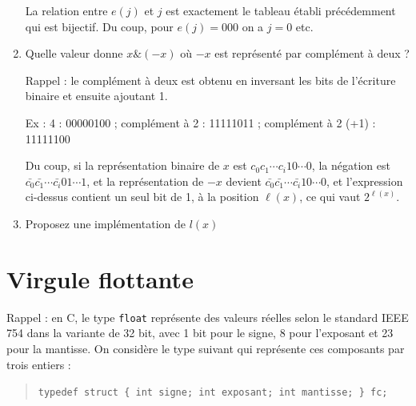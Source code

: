 \documentclass[11pt]{article}
\begin{document}
\begin{enumerate}
\begin{solution}
La relation entre $e(j)$ et $j$ est exactement le tableau établi
précédemment qui est bijectif. Du coup, pour $e(j)=000$
on a $j=0$ etc.
\end{solution}

 \item Quelle valeur donne $x\mathbin{\&}(-x)$
où $-x$ est représenté par complément à deux ?

\begin{solution}
Rappel : le complément à deux est obtenu en inversant les bits de l'écriture
binaire et ensuite ajoutant 1.

Ex : 4 : 00000100 ; complément à 2 : 11111011 ; complément à 2 (+1) : 11111100

Du coup, si la représentation binaire de $x$ est $c_0c_1\cdots c_i10\cdots 0$,
la négation est $\bar{c_0}\bar{c_1}\cdots\bar{c_i}01\cdots 1$, et
la représentation de $-x$ devient $\bar{c_0}\bar{c_1}\cdots\bar{c_i}10\cdots 0$,
et l'expression ci-dessus contient un seul bit de 1, à la position $\ell(x)$,
ce qui vaut $2^{\ell(x)}$.
\end{solution}

 \item Proposez une implémentation de $l(x)$

\end{enumerate}



\section{Virgule flottante}

Rappel : en C, le type \texttt{float} repr\'esente des valeurs r\'eelles
selon le standard IEEE 754 dans la variante de 32 bit, avec 1 bit pour
le signe, 8 pour l'exposant et 23 pour la mantisse. On consid\`ere le
type suivant qui repr\'esente ces composants par trois entiers :

\begin{quote}
\verb+typedef struct { int signe; int exposant; int mantisse; } fc;+
\end{quote}
\end{document}
